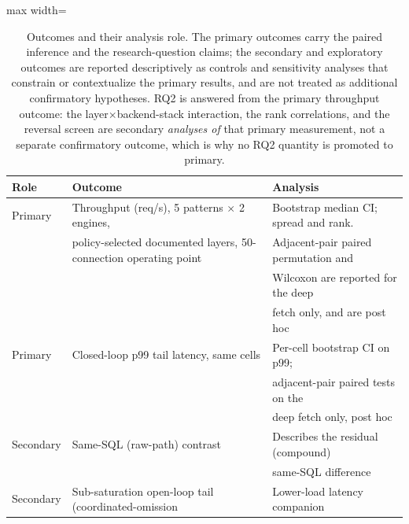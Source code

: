 \begin{table}[htbp]
  \centering
  \caption{Outcomes and their analysis role. The primary outcomes carry the
    paired inference and the research-question claims; the secondary and
    exploratory outcomes are reported descriptively as controls and sensitivity
    analyses that constrain or contextualize the primary results, and are not treated
    as additional confirmatory hypotheses. RQ2 is answered from the primary throughput
    outcome: the layer$\times$backend-stack interaction, the rank correlations, and the
    reversal screen are secondary \emph{analyses of} that primary measurement, not a
    separate confirmatory outcome, which is why no RQ2 quantity is promoted to primary.}
  \label{tab:outcomes}
  \begin{adjustbox}{max width=\textwidth}
  \begin{tabular}{l l l}
    \toprule
    Role & Outcome & Analysis \\
    \midrule
    Primary   & Throughput (req/s), 5 patterns $\times$ 2 engines,      & Bootstrap median CI; spread and rank. \\
              & policy-selected documented layers, 50-connection operating point         & Adjacent-pair paired permutation and \\
              &                                                          & Wilcoxon are reported for the deep \\
              &                                                          & fetch only, and are post hoc \\
    Primary   & Closed-loop p99 tail latency, same cells                & Per-cell bootstrap CI on p99;      \\
              &                                                         & adjacent-pair paired tests on the  \\
              &                                                         & deep fetch only, post hoc         \\
    \midrule
    Secondary & Same-SQL (raw-path) contrast                            & Describes the residual (compound)  \\
              &                                                         & same-SQL difference                \\
    Secondary & Sub-saturation open-loop tail (coordinated-omission     & Lower-load latency companion       \\

\end{tabular}
\end{adjustbox}
\end{table}
